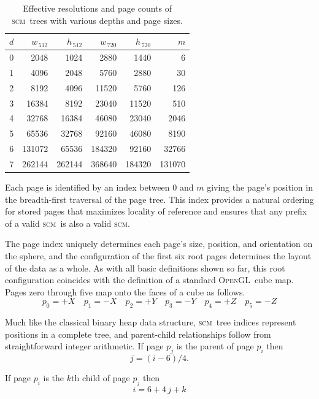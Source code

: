 \documentclass[oneside,10pt]{memoir}
\newcommand{\opengl}  {\textsc{OpenGL}}
\newcommand{\scm}     {\textsc{scm}}
\newcommand{\B}{\bigstrut[b]}
\newcommand{\T}{\bigstrut[t]}
\begin{document}
\begin{Spacing}{1.1}
\begin{table}
  \centering
  \label{tab:resolution}
  \begin{tabular}{r|rr|rr|r}
  $d$& $w_{\,512}$& $h_{\,512}$& $w_{\,720}$& $h_{\,720}$& $m$ \B\\\hline
  \num{0}&  \num{2048}&  \num{1024}&  \num{2880}&  \num{1440}&     \num{6} \T\\
  \num{1}&  \num{4096}&  \num{2048}&  \num{5760}&  \num{2880}&    \num{30} \\
  \num{2}&  \num{8192}&  \num{4096}& \num{11520}&  \num{5760}&   \num{126} \\
  \num{3}& \num{16384}&  \num{8192}& \num{23040}& \num{11520}&   \num{510} \\
  \num{4}& \num{32768}& \num{16384}& \num{46080}& \num{23040}&  \num{2046} \\
  \num{5}& \num{65536}& \num{32768}& \num{92160}& \num{46080}&  \num{8190} \\
  \num{6}&\num{131072}& \num{65536}&\num{184320}& \num{92160}& \num{32766} \\
  \num{7}&\num{262144}&\num{262144}&\num{368640}&\num{184320}&\num{131070} \\
  \end{tabular}
  \caption{Effective resolutions and page counts of \scm\ trees with various depths and page sizes.}
\end{table}

Each page is identified by an index between $0$ and $m$ giving the page's position in the breadth-first traversal of the page tree. This index provides a natural ordering for stored pages that maximizes locality of reference and ensures that any prefix of a valid \scm\ is also a valid \scm.

The page index uniquely determines each page's size, position, and orientation on the sphere, and the configuration of the first six root pages determines the layout of the data as a whole. As with all basic definitions shown so far, this root configuration coincides with the definition of a standard \opengl\ cube map. Pages zero through five map onto the faces of a cube as follows.
\[p_0=+X\quad p_1=-X\quad p_2=+Y\quad p_3=-Y\quad p_4=+Z\quad p_5=-Z\]

Much like the classical binary heap data structure, \scm\ tree indices represent positions in a complete tree, and parent-child relationships follow from straightforward integer arithmetic. If page $p_j$ is the parent of page $p_i$ then
\[j=(i-6)/4.\]

If page $p_i$ is the $k$th child of page $p_j$ then
\[i=6+4\,j+k\]


\end{Spacing}
\end{document}
